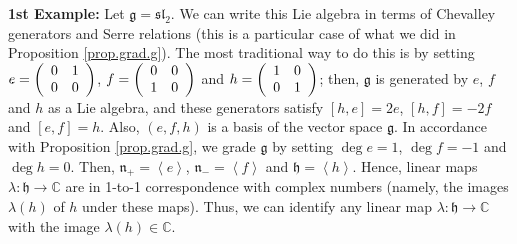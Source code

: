 \documentclass
[numbers=enddot,12pt,final,onecolumn,german,notitlepage]{scrartcl}%
\theoremstyle{definition}
\begin{document}
\textbf{1st Example:} Let $\mathfrak{g}=\mathfrak{sl}_{2}$. We can write this
Lie algebra in terms of Chevalley generators and Serre relations (this is a
particular case of what we did in Proposition \ref{prop.grad.g}). The most
traditional way to do this is by setting $e=\left(
\begin{array}
[c]{cc}%
0 & 1\\
0 & 0
\end{array}
\right)  $, $f=\left(
\begin{array}
[c]{cc}%
0 & 0\\
1 & 0
\end{array}
\right)  $ and $h=\left(
\begin{array}
[c]{cc}%
1 & 0\\
0 & 1
\end{array}
\right)  $; then, $\mathfrak{g}$ is generated by $e$, $f$ and $h$ as a Lie
algebra, and these generators satisfy $\left[  h,e\right]  =2e$, $\left[
h,f\right]  =-2f$ and $\left[  e,f\right]  =h$. Also, $\left(  e,f,h\right)  $
is a basis of the vector space $\mathfrak{g}$. In accordance with Proposition
\ref{prop.grad.g}, we grade $\mathfrak{g}$ by setting $\deg e=1$, $\deg f=-1$
and $\deg h=0$. Then, $\mathfrak{n}_{+}=\left\langle e\right\rangle $,
$\mathfrak{n}_{-}=\left\langle f\right\rangle $ and $\mathfrak{h}=\left\langle
h\right\rangle $. Hence, linear maps $\lambda:\mathfrak{h}\rightarrow
\mathbb{C}$ are in 1-to-1 correspondence with complex numbers (namely, the
images $\lambda\left(  h\right)  $ of $h$ under these maps). Thus, we can
identify any linear map $\lambda:\mathfrak{h}\rightarrow\mathbb{C}$ with the
image $\lambda\left(  h\right)  \in\mathbb{C}$.
\end{document}
